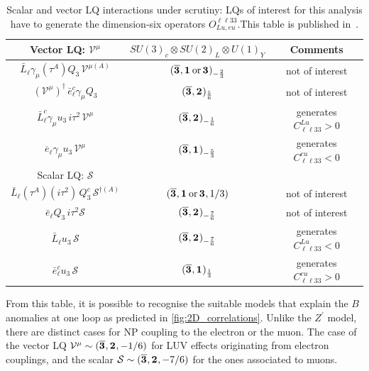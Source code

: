 \begin{table}[!ht]
	\centering
	{
		\begin{tabular}{ccc }
			\toprule
			Vector LQ: $\mathcal{V^\mu}$ & $SU(3)_{c} \otimes SU(2)_{L} \otimes U(1)_{Y}$ & Comments \\
			\midrule
			$ \bar L_\ell  \gamma_\mu (\tau^A) Q_3 \, \mathcal{V}^{\mu (A)} $ & $(\overline{\irrep{3}},\irrep{1}\,\text{or}\,\irrep{3} )_{-{2\over3}}$ & not of interest \\
			$  ( \mathcal{V^\mu} )^{\dagger} \,\bar e_\ell^c  \gamma_\mu Q_3 $ & $(\overline{\irrep{3}},\irrep{2} )_{5\over6}$ & not of interest \\
			$\bar{L}^c_\ell \gamma_\mu u_3\, i\tau^2 \, \mathcal{V^\mu}$ & $(\overline{\irrep{3}},\irrep{2} )_{-{1\over6}}$ & generates $C^{Lu}_{\ell \ell 33} > 0$\\
			$ \overline {e}_\ell \gamma_\mu u_3\, \mathcal{V^\mu}$ & $(\overline{\irrep{3}},\irrep{1} )_{-{5\over3}}$ & generates $C^{eu}_{\ell \ell 33} < 0$ \\    
			\midrule
			Scalar LQ: $\mathcal{S}$ &  &  \\
			\midrule
			$\bar L_\ell (\tau^A) (i \tau^{2}) \, Q_3^{c} \,\mathcal{S}^{\dagger (A)} $ & $(\overline{\irrep{3}},\irrep{1}\,\text{or}\,\irrep{3} ,1/3 )$ & not of interest  \\    
			$\bar e_\ell Q_3 \,  i \tau^2 \mathcal{S} $ & $(\overline{\irrep{3}},\irrep{2} )_{-{7\over6}}$ & not of interest \\
			$\bar L_\ell u_3\, \mathcal{S} $  & $(\overline{\irrep{3}},\irrep{2} )_{-{7\over6}}$  & generates $C^{Lu}_{\ell \ell 33} < 0$ \\
			$\bar e_\ell^c u_3\, \mathcal{S}$ & $(\overline{\irrep{3}},\irrep{1})_{1\over3}$ & generates $C^{eu}_{\ell \ell 33} > 0$ \\
			\bottomrule
		\end{tabular}
	}
	\caption{Scalar and vector LQ interactions under scrutiny: LQs of interest for this analysis have to generate the dimension-six operators $O_{Lu,eu}^{\ell \ell 33}$.This table is published in~\cite{Alasfar:2020mne}.}
	\label{tab:LQmodels}
\end{table}
From this table, it is possible to recognise the suitable models that explain the $B$ anomalies at one loop as predicted in \autoref{fig:2D_correlations}. Unlike the $Z^\prime$ model, there are distinct cases for NP coupling to the electron or the muon. The case of the vector LQ $ \mathcal V^\mu\sim(\overline{\irrep{3}},\irrep{2}, -1/6 )$ for LUV effects originating from electron couplings, and the scalar $\mathcal S\sim (\overline{\irrep{3}},\irrep{2} ,-7/6 )$ for the ones associated to muons.
